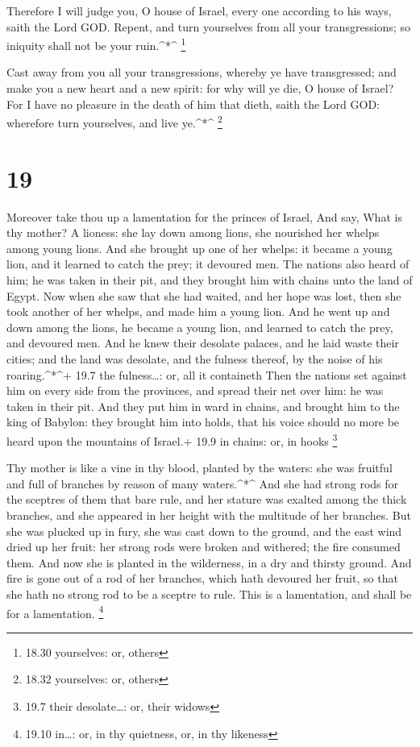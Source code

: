  Therefore I will judge you, O house of Israel, every one
according to his ways, saith the Lord GOD. Repent, and turn yourselves
from all your transgressions; so iniquity shall not be your
ruin.\^{}*\^{} \footnote{18.30 yourselves: or, others}

 Cast away from you all your transgressions, whereby ye
have transgressed; and make you a new heart and a new spirit: for why
will ye die, O house of Israel?  For I have no pleasure in
the death of him that dieth, saith the Lord GOD: wherefore turn
yourselves, and live ye.\^{}*\^{} \footnote{18.32 yourselves: or, others}

\hypertarget{section-18}{%
\section{19}\label{section-18}}

 Moreover take thou up a lamentation for the princes of
Israel,  And say, What is thy mother? A lioness: she lay
down among lions, she nourished her whelps among young lions.
 And she brought up one of her whelps: it became a young
lion, and it learned to catch the prey; it devoured men. 
The nations also heard of him; he was taken in their pit, and they
brought him with chains unto the land of Egypt.  Now when
she saw that she had waited, and her hope was lost, then she took
another of her whelps, and made him a young lion.  And he
went up and down among the lions, he became a young lion, and learned to
catch the prey, and devoured men.  And he knew their
desolate palaces, and he laid waste their cities; and the land was
desolate, and the fulness thereof, by the noise of his
roaring.\^{}*\^{}+ 19.7 the fulness\ldots: or, all it containeth
 Then the nations set against him on every side from the
provinces, and spread their net over him: he was taken in their pit.
 And they put him in ward in chains, and brought him to the
king of Babylon: they brought him into holds, that his voice should no
more be heard upon the mountains of Israel.+ 19.9 in chains: or, in
hooks \footnote{19.7 their desolate\ldots: or, their widows}

 Thy mother is like a vine in thy blood, planted by the
waters: she was fruitful and full of branches by reason of many
waters.\^{}*\^{}  And she had strong rods for the sceptres
of them that bare rule, and her stature was exalted among the thick
branches, and she appeared in her height with the multitude of her
branches.  But she was plucked up in fury, she was cast
down to the ground, and the east wind dried up her fruit: her strong
rods were broken and withered; the fire consumed them.  And
now she is planted in the wilderness, in a dry and thirsty ground.
 And fire is gone out of a rod of her branches, which hath
devoured her fruit, so that she hath no strong rod to be a sceptre to
rule. This is a lamentation, and shall be for a lamentation. \footnote{19.10
  in\ldots: or, in thy quietness, or, in thy likeness}


